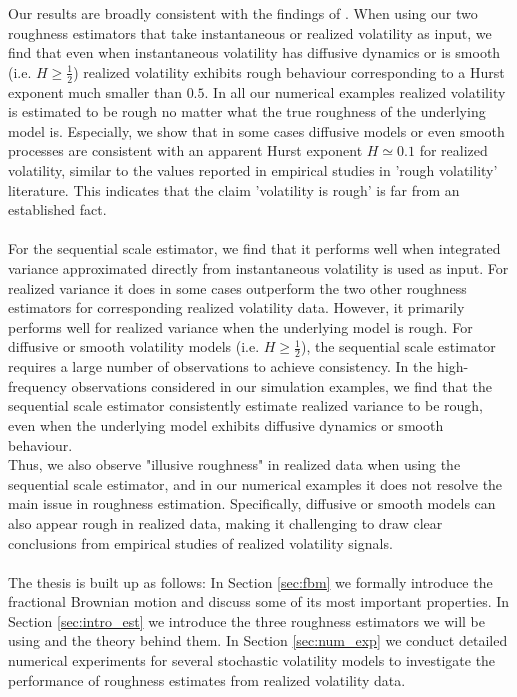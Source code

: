 \documentclass{article}
\begin{document}
Our results are broadly consistent with the findings of \cite{cont}. When using our two roughness estimators that take instantaneous or realized volatility as input, we find that even when instantaneous volatility has diffusive dynamics or is smooth (i.e. $H\geq \frac{1}{2}$) realized volatility exhibits rough behaviour corresponding to a Hurst exponent much smaller than $0.5$. In all our numerical examples realized volatility is estimated to be rough no matter what the true roughness of the underlying model is. Especially, we show that in some cases diffusive models or even smooth processes are consistent with an apparent Hurst exponent $H\simeq 0.1$ for realized volatility, similar to the values reported in empirical studies in 'rough volatility' literature. This indicates that the claim 'volatility is rough' is far from an established fact.\\\\
For the sequential scale estimator, we find that it performs well when integrated variance approximated directly from instantaneous volatility is used as input. For realized variance it does in some cases outperform the two other roughness estimators for corresponding realized volatility data. However, it primarily performs well for realized variance when the underlying model is rough. For diffusive or smooth volatility models (i.e. $H\geq \frac{1}{2}$), the sequential scale estimator requires a large number of observations to achieve consistency. In the high-frequency observations considered in our simulation examples, we find that the sequential scale estimator consistently estimate realized variance to be rough, even when the underlying model exhibits diffusive dynamics or smooth behaviour.  \\
Thus, we also observe "illusive roughness" in realized data when using the sequential scale estimator, and in our numerical examples it does not resolve the main issue in roughness estimation. Specifically, diffusive or smooth models can also appear rough in realized data, making it challenging to draw clear conclusions from empirical studies of realized volatility signals.\\\\
The thesis is built up as follows: In Section \ref{sec:fbm} we formally introduce the fractional Brownian motion and discuss some of its most important properties. In Section \ref{sec:intro_est} we introduce the three roughness estimators we will be using and the theory behind them. In Section \ref{sec:num_exp} we conduct detailed numerical experiments for several stochastic volatility models to investigate the performance of roughness estimates from realized volatility data.
\end{document}
